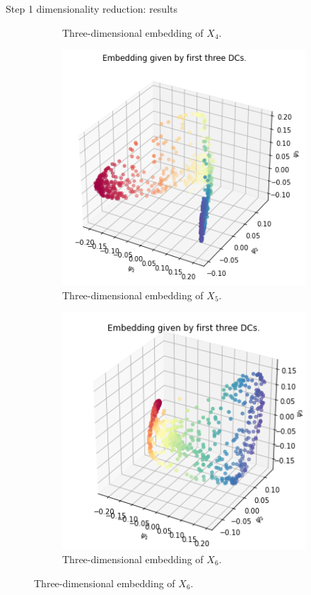 \documentclass[xcolor={dvipsnames,svgnames}]{beamer}
\begin{document}
\begin{frame}{Step 1 dimensionality reduction: results}
\begin{figure}[H]
\begin{subfigure}[b]{0.3\textwidth}
    \caption{Three-dimensional embedding of $X_4$.}
\end{subfigure}
\hfill
\begin{subfigure}[b]{0.3\textwidth}
    \includegraphics[width=\textwidth]{figures/X5_embedding.png}
    \caption{Three-dimensional embedding of $X_5$.}
\end{subfigure}
\hfill
\begin{subfigure}[b]{0.3\textwidth}
    \includegraphics[width=\textwidth]{figures/X6_embedding.png}
    \caption{Three-dimensional embedding of $X_6$.}
\end{subfigure}
\end{figure}
\end{frame}
\end{document}
